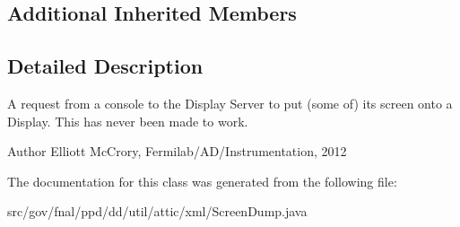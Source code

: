 \subsection*{Additional Inherited Members}


\subsection{Detailed Description}
A request from a console to the Display Server to put (some of) its screen onto a Display. This has never been made to work.

\begin{DoxyAuthor}{Author}
Elliott Mc\-Crory, Fermilab/\-A\-D/\-Instrumentation, 2012 
\end{DoxyAuthor}


The documentation for this class was generated from the following file\-:\begin{DoxyCompactItemize}
\item 
src/gov/fnal/ppd/dd/util/attic/xml/Screen\-Dump.\-java\end{DoxyCompactItemize}
